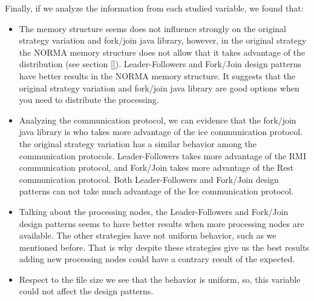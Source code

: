 Finally, if we analyze the information from each studied variable, we found that:
\begin{itemize}
	\item The memory structure seems does not influence strongly on the original strategy variation and fork/join java library, however, in the original strategy the NORMA memory structure does not allow that it takes advantage of the distribution (see section \ref{}). Leader-Followers and Fork/Join design patterns have better results in the NORMA memory structure. It suggests that the original strategy variation and fork/join java library are good options when you need to distribute the processing.
	\item  Analyzing the communication protocol, we can evidence that the fork/join java library is who takes more advantage of the ice communication protocol. the original strategy variation has a similar behavior among the communication protocols. Leader-Followers takes more advantage of the RMI communication protocol, and Fork/Join takes more advantage of the Rest communication protocol. Both Leader-Followers and Fork/Join design patterns can not take much advantage of the Ice communication protocol.
	\item Talking about the processing nodes, the Leader-Followers and Fork/Join design patterns seems to have better results when more processing nodes are available. The other strategies have not uniform behavior, such as we mentioned before. That is why despite these strategies give us the best results adding new processing nodes could have a contrary result of the expected.
	\item Respect to the file size we see that the behavior is uniform, so, this variable could not affect the design patterns.
\end{itemize}

